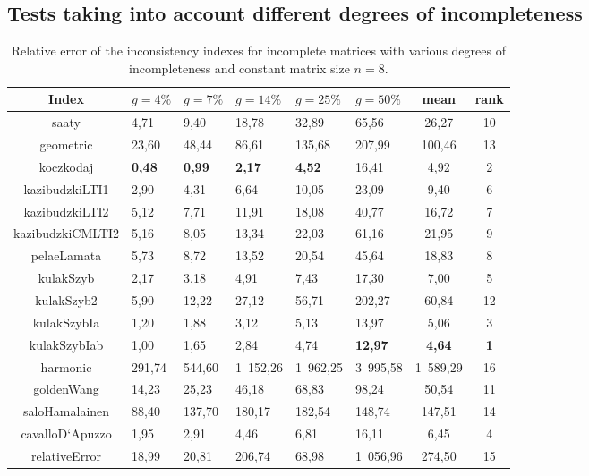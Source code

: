 \subsection{Tests taking into account different degrees of incompleteness}
\begin{table}[h]
\begin{center}
\caption{Relative error of the inconsistency indexes for incomplete matrices with various degrees of incompleteness and constant matrix size $n=8$.}
\label{tab:results1}
\begin{tabular}{|c||l|l|l|l|l|c||c|}
\hline Index & $g=4\%$ & $g=7\%$ & $g=14\%$ & $g=25\%$ & $g=50\%$ & mean & rank \\ \hline \hline
saaty & 4,71 & 9,40 & 18,78 & 32,89 & 65,56 & 26,27 & 10 \\ \hline
geometric & 23,60 & 48,44 & 86,61 & 135,68 & 207,99 & 100,46  & 13 \\ \hline
koczkodaj & \textbf{0,48} & \textbf{0,99} & \textbf{2,17} & \textbf{4,52} & 16,41 & 4,92 & 2 \\ \hline
kazibudzkiLTI1 & 2,90 & 4,31 & 6,64 & 10,05 & 23,09 & 9,40 & 6 \\ \hline
kazibudzkiLTI2 & 5,12 & 7,71 & 11,91 & 18,08 & 40,77 & 16,72 & 7 \\ \hline
kazibudzkiCMLTI2 & 5,16 & 8,05 & 13,34 & 22,03 & 61,16 & 21,95 & 9 \\ \hline
pelaeLamata & 5,73 & 8,72 & 13,52 & 20,54 & 45,64 & 18,83 & 8 \\ \hline
kulakSzyb & 2,17 & 3,18 & 4,91 & 7,43 & 17,30 & 7,00 & 5 \\ \hline
kulakSzyb2 & 5,90 & 12,22 & 27,12 & 56,71 & 202,27 & 60,84 & 12 \\ \hline
kulakSzybIa & 1,20 & 1,88 & 3,12 & 5,13 & 13,97 & 5,06 & 3 \\ \hline
kulakSzybIab & 1,00 & 1,65 & 2,84 & 4,74 & \textbf{12,97} & \textbf{4,64} & \textbf{1} \\ \hline
harmonic & 291,74 & 544,60 & 1 152,26 & 1 962,25 & 3 995,58 & 1 589,29 & 16 \\ \hline
goldenWang & 14,23 & 25,23 & 46,18 & 68,83 & 98,24 & 50,54 & 11 \\ \hline
saloHamalainen & 88,40 & 137,70 & 180,17 & 182,54 & 148,74 & 147,51 & 14 \\ \hline
cavalloD`Apuzzo & 1,95 & 2,91 & 4,46 & 6,81 & 16,11 & 6,45 & 4 \\ \hline
relativeError & 18,99 & 20,81 & 206,74 & 68,98 & 1 056,96 & 274,50 & 15 \\ \hline
\end{tabular}
\end{center}
\end{table}

